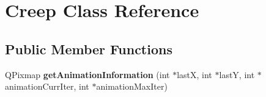 \hypertarget{class_creep}{}\section{Creep Class Reference}
\label{class_creep}
\subsection*{Public Member Functions}
\begin{DoxyCompactItemize}
\item 
\hypertarget{class_creep_aa95ebd1995300d7b49c5fcc08e920f6c}{}Q\+Pixmap {\bfseries get\+Animation\+Information} (int $\ast$last\+X, int $\ast$last\+Y, int $\ast$animation\+Curr\+Iter, int $\ast$animation\+Max\+Iter)\label{class_creep_aa95ebd1995300d7b49c5fcc08e920f6c}

\end{DoxyCompactItemize}
